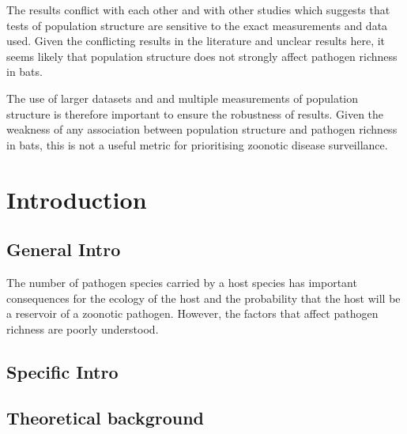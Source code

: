 The results conflict with each other and with other studies which suggests that tests of population structure are sensitive to the exact measurements and data used.
Given the conflicting results in the literature and unclear results here, it seems likely that population structure does not strongly affect pathogen richness in bats.


The use of larger datasets and and multiple measurements of population structure is therefore important to ensure the robustness of results.
Given the weakness of any association between population structure and pathogen richness in bats, this is not a useful metric for prioritising zoonotic disease surveillance.








\section{Introduction}


\subsection{General Intro}
The number of pathogen species carried by a host species has important consequences for the ecology of the host and the probability that the host will be a reservoir of a zoonotic pathogen.
However, the factors that affect pathogen richness are poorly understood.



\subsection{Specific Intro}



\subsection{Theoretical background}

